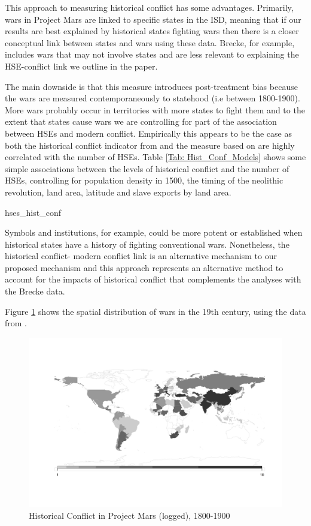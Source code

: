 This approach to measuring historical conflict has some advantages. Primarily,
wars in Project Mars are linked to specific states in the ISD, meaning that if
our results are best explained by historical states fighting wars then there is
a closer conceptual link between states and wars using these data. Brecke, for
example, includes wars that may not involve states and are less relevant to
explaining the HSE-conflict link we outline in the paper. 

The main downside is that this measure introduces post-treatment bias because
the wars are measured contemporaneously to statehood (i.e between 1800-1900).
More wars probably occur in territories with more states to fight them and to
the extent that states cause wars we are controlling for part of the association
between HSEs and modern conflict. Empirically this appears to be the case as
both the historical conflict indicator from \citet{Dincecco2019} and the measure
based on \citet{Lyall2020} are highly correlated with the number of HSEs. Table
\ref{Tab: Hist_Conf_Models} shows some simple associations between the levels of
historical conflict and the number of HSEs, controlling for population density
in 1500, the timing of the neolithic revolution, land area, latitude and slave
exports by land area. 

{hses_hist_conf}

Symbols and institutions, for example, could be more potent or established when
historical states have a history of fighting conventional wars. Nonetheless, the
historical conflict- modern conflict link is an alternative mechanism to our
proposed mechanism and this approach represents an alternative method to account
for the impacts of historical conflict that complements the analyses with the
Brecke data. 

Figure \ref{Fig: Mars_Map} shows the spatial distribution of wars in the 19th
century, using the data from \citet{Lyall2020}. 

\begin{figure}[hpbt] 
   	\includegraphics[width=\textwidth]{img/historical_conflict_pm_map.png} 
	\caption{Historical Conflict in Project Mars (logged), 1800-1900} 
	\label{Fig: Mars_Map} 
\end{figure}


